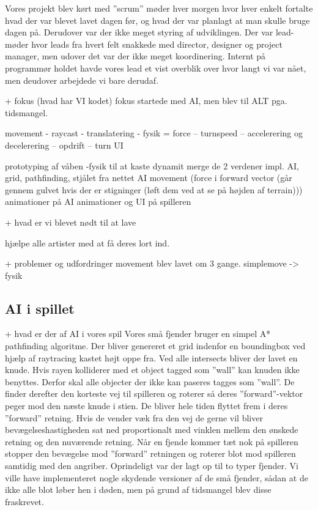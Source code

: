 Vores projekt blev kørt med ''scrum'' møder hver morgen hvor hver enkelt fortalte hvad der var blevet  lavet dagen før, og hvad der var planlagt at man skulle bruge dagen på.
Derudover var der ikke meget styring af udviklingen. Der var lead-møder hvor leads fra hvert felt snakkede med director, designer og project manager, men udover det var der ikke meget koordinering. Internt på programmør holdet havde vores lead et vist overblik over hvor langt vi var nået, men deudover arbejdede vi bare derudaf.




                + fokus (hvad har VI kodet)
fokus startede med AI, men blev til ALT pga. tidsmangel.

movement
- raycast
- translatering
- fysik = force
-- turnspeed
-- accelerering og decelerering
-- opdrift
-- turn UI

prototyping af våben
-fysik til at kaste dynamit
merge de 2 verdener
impl. AI, grid, pathfinding, stjålet fra nettet
AI movement (force i forward vector (går gennem gulvet hvis der er stigninger (løft dem ved at se på højden af terrain)))
animationer på AI
animationer og UI på spilleren


                + hvad er vi blevet nødt til at lave

hjælpe alle artister med at få deres lort ind.

                + problemer og udfordringer
movement blev lavet om 3 gange.
simplemove -> fysik

\subsection{AI i spillet}

                + hvad er der af AI i vores spil
Vores små fjender bruger en simpel A* pathfinding algoritme. Der bliver genereret et grid indenfor en boundingbox ved hjælp af raytracing kastet højt oppe fra. Ved alle intersects bliver der lavet en knude. Hvis rayen kolliderer med et object tagged som ''wall'' kan knuden ikke benyttes. Derfor skal alle objecter der ikke kan paseres tagges som ''wall''.
De finder derefter den korteste vej til spilleren og roterer så deres ''forward''-vektor peger mod den næste knude i stien. De bliver hele tiden flyttet frem i deres ''forward'' retning. Hvis de vender væk fra den vej de gerne vil bliver bevægelseshastigheden sat ned proportionalt med vinklen mellem den ønskede retning og den nuværende retning.
Når en fjende kommer tæt nok på spilleren stopper den bevægelse mod ''forward'' retningen og roterer blot mod spilleren samtidig med den angriber. 
Oprindeligt var der lagt op til to typer fjender. Vi ville have implementeret nogle skydende versioner af de små fjender, sådan at de ikke alle blot løber hen i døden, men på grund af tidsmangel blev disse fraskrevet.

